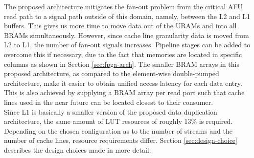 The proposed architecture mitigates the fan-out problem from the critical AFU read path to a signal path outside of this domain, namely, between the L2 and L1 buffers. This gives us more time to move data out of the URAMs and into all BRAMs simultaneously. However, since cache line granularity data is moved from L2 to L1, the number of fan-out signals increases. Pipeline stages can be added to overcome this if necessary, due to the fact that memories are located in specific columns as shown in Section \ref{sec:fpga-arch}. The smaller BRAM arrays in this proposed architecture, as compared to the element-wise double-pumped architecture, make it easier to obtain unified access latency for each data entry. This is also achieved by supplying a BRAM array per read port such that cache lines used in the near future can be located closest to their consumer.\\
Since L1 is basically a smaller version of the proposed data duplication architecture, the same amount of LUT resources of roughly 13\% is required. Depending on the chosen configuration as to the number of streams and the number of cache lines, resource requirements differ. Section \ref{sec:design-choice} describes the design choices made in more detail.
